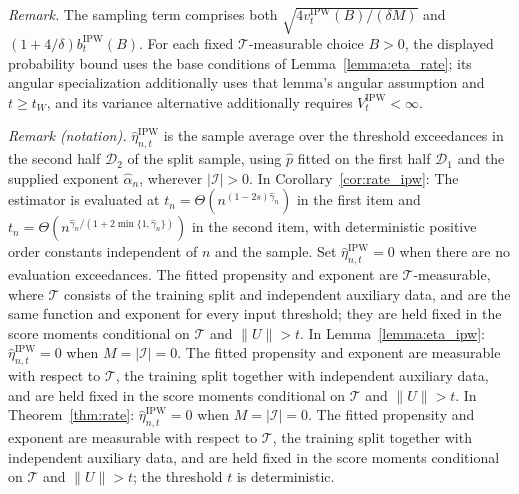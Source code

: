 \documentclass[12pt]{article}
\theoremstyle{plain}
\theoremstyle{definition}
\begin{document}
\noindent\textit{Remark.} The sampling term comprises both $\sqrt{4v_t^{\text{IPW}}(B)/(\delta M)}$ and $(1+4/\delta)b_t^{\text{IPW}}(B)$. For each fixed $\mathcal T$-measurable choice $B>0$, the displayed probability bound uses the base conditions of Lemma~\ref{lemma:eta_rate}; its angular specialization additionally uses that lemma's angular assumption and $t\geq t_W$, and its variance alternative additionally requires $V_t^{\text{IPW}}<\infty$.

\noindent\textit{Remark (notation).} $\hat\eta_{n,t}^{\mathrm{IPW}}$ is the sample average over the threshold exceedances in the second half $\mathcal{D}_2$ of the split sample, using $\hat p$ fitted on the first half $\mathcal{D}_1$ and the supplied exponent $\hat\alpha_n$, wherever $|\mathcal{I}|>0$. In Corollary~\ref{cor:rate_ipw}: The estimator is evaluated at $t_n=\Theta(n^{(1-2s)\hat\gamma_n})$ in the first item and $t_n=\Theta(n^{\hat\gamma_n/(1+2\min\{1,\hat\gamma_n\})})$ in the second item, with deterministic positive order constants independent of $n$ and the sample. Set $\hat\eta_{n,t}^{\mathrm{IPW}}=0$ when there are no evaluation exceedances. The fitted propensity and exponent are $\mathcal T$-measurable, where $\mathcal T$ consists of the training split and independent auxiliary data, and are the same function and exponent for every input threshold; they are held fixed in the score moments conditional on $\mathcal T$ and $\|U\|>t$. In Lemma~\ref{lemma:eta_ipw}: $\hat\eta_{n,t}^{\mathrm{IPW}}=0$ when $M=|\mathcal I|=0$. The fitted propensity and exponent are measurable with respect to $\mathcal T$, the training split together with independent auxiliary data, and are held fixed in the score moments conditional on $\mathcal T$ and $\|U\|>t$. In Theorem~\ref{thm:rate}: $\hat\eta_{n,t}^{\mathrm{IPW}}=0$ when $M=|\mathcal I|=0$. The fitted propensity and exponent are measurable with respect to $\mathcal T$, the training split together with independent auxiliary data, and are held fixed in the score moments conditional on $\mathcal T$ and $\|U\|>t$; the threshold $t$ is deterministic.
\end{document}
